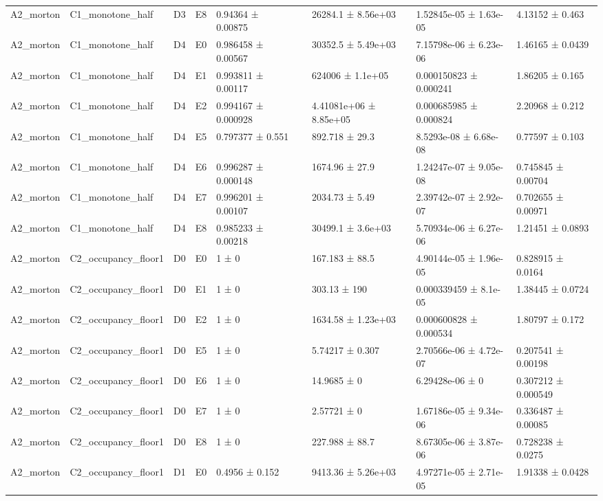 \begin{table}
\begin{tabular}{lllllllll}
A2\_morton & C1\_monotone\_half & D3 & E8 & 0.94364 ± 0.00875 &  & 26284.1 ± 8.56e+03 & 1.52845e-05 ± 1.63e-05 & 4.13152 ± 0.463 \\
A2\_morton & C1\_monotone\_half & D4 & E0 & 0.986458 ± 0.00567 &  & 30352.5 ± 5.49e+03 & 7.15798e-06 ± 6.23e-06 & 1.46165 ± 0.0439 \\
A2\_morton & C1\_monotone\_half & D4 & E1 & 0.993811 ± 0.00117 &  & 624006 ± 1.1e+05 & 0.000150823 ± 0.000241 & 1.86205 ± 0.165 \\
A2\_morton & C1\_monotone\_half & D4 & E2 & 0.994167 ± 0.000928 &  & 4.41081e+06 ± 8.85e+05 & 0.000685985 ± 0.000824 & 2.20968 ± 0.212 \\
A2\_morton & C1\_monotone\_half & D4 & E5 & 0.797377 ± 0.551 &  & 892.718 ± 29.3 & 8.5293e-08 ± 6.68e-08 & 0.77597 ± 0.103 \\
A2\_morton & C1\_monotone\_half & D4 & E6 & 0.996287 ± 0.000148 &  & 1674.96 ± 27.9 & 1.24247e-07 ± 9.05e-08 & 0.745845 ± 0.00704 \\
A2\_morton & C1\_monotone\_half & D4 & E7 & 0.996201 ± 0.00107 &  & 2034.73 ± 5.49 & 2.39742e-07 ± 2.92e-07 & 0.702655 ± 0.00971 \\
A2\_morton & C1\_monotone\_half & D4 & E8 & 0.985233 ± 0.00218 &  & 30499.1 ± 3.6e+03 & 5.70934e-06 ± 6.27e-06 & 1.21451 ± 0.0893 \\
A2\_morton & C2\_occupancy\_floor1 & D0 & E0 & 1 ± 0 &  & 167.183 ± 88.5 & 4.90144e-05 ± 1.96e-05 & 0.828915 ± 0.0164 \\
A2\_morton & C2\_occupancy\_floor1 & D0 & E1 & 1 ± 0 &  & 303.13 ± 190 & 0.000339459 ± 8.1e-05 & 1.38445 ± 0.0724 \\
A2\_morton & C2\_occupancy\_floor1 & D0 & E2 & 1 ± 0 &  & 1634.58 ± 1.23e+03 & 0.000600828 ± 0.000534 & 1.80797 ± 0.172 \\
A2\_morton & C2\_occupancy\_floor1 & D0 & E5 & 1 ± 0 &  & 5.74217 ± 0.307 & 2.70566e-06 ± 4.72e-07 & 0.207541 ± 0.00198 \\
A2\_morton & C2\_occupancy\_floor1 & D0 & E6 & 1 ± 0 &  & 14.9685 ± 0 & 6.29428e-06 ± 0 & 0.307212 ± 0.000549 \\
A2\_morton & C2\_occupancy\_floor1 & D0 & E7 & 1 ± 0 &  & 2.57721 ± 0 & 1.67186e-05 ± 9.34e-06 & 0.336487 ± 0.00085 \\
A2\_morton & C2\_occupancy\_floor1 & D0 & E8 & 1 ± 0 &  & 227.988 ± 88.7 & 8.67305e-06 ± 3.87e-06 & 0.728238 ± 0.0275 \\
A2\_morton & C2\_occupancy\_floor1 & D1 & E0 & 0.4956 ± 0.152 &  & 9413.36 ± 5.26e+03 & 4.97271e-05 ± 2.71e-05 & 1.91338 ± 0.0428 \\

\end{tabular}
\end{table}
